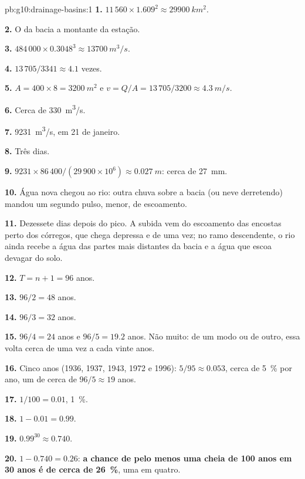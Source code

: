 \begin{solution}{pb:g10:drainage-basins:1}
\textbf{1.} $11\,560 \times 1.609^2 \approx \qty{29900}{km^2}$.

\textbf{2.} O  da bacia a montante da estação.

\textbf{3.} $484\,000 \times 0.3048^3 \approx \qty{13700}{m^3/s}$.

\textbf{4.} $13\,705/3341 \approx 4.1$ vezes.

\textbf{5.} $A = 400 \times 8 = \qty{3200}{m^2}$ e $v = Q/A = 13\,705/3200
\approx \qty{4.3}{m/s}$.

\textbf{6.} Cerca de \qty{330}{m^3/s}.

\textbf{7.} \qty{9231}{m^3/s}, em 21 de janeiro.

\textbf{8.} Três dias.

\textbf{9.} $9231 \times 86\,400/(29\,900 \times 10^6) \approx
\qty{0.027}{m}$: cerca de \qty{27}{mm}.

\textbf{10.} Água nova chegou ao rio: outra chuva sobre a bacia (ou neve
derretendo) mandou um segundo pulso, menor, de escoamento.

\textbf{11.} Dezessete dias depois do pico. A subida vem do escoamento das
encostas perto dos córregos, que chega depressa e de uma vez; no ramo
descendente, o rio ainda recebe a água das partes mais distantes da bacia e
a água que escoa devagar do solo.

\textbf{12.} $T = n + 1 = 96$ anos.

\textbf{13.} $96/2 = 48$ anos.

\textbf{14.} $96/3 = 32$ anos.

\textbf{15.} $96/4 = 24$ anos e $96/5 = 19.2$ anos. Não muito: de um modo
ou de outro, essa  volta cerca de uma vez a cada vinte anos.

\textbf{16.} Cinco anos (1936, 1937, 1943, 1972 e 1996): $5/95 \approx
0.053$, cerca de \qty{5}{\percent} por ano, um  de cerca de
$96/5 \approx 19$ anos.

\textbf{17.} $1/100 = 0.01$, \qty{1}{\percent}.

\textbf{18.} $1 - 0.01 = 0.99$.

\textbf{19.} $0.99^{30} \approx 0.740$.

\textbf{20.} $1 - 0.740 = 0.26$: \textbf{a chance de pelo menos uma cheia de
100 anos em 30 anos é de cerca de \qty{26}{\percent}}, uma em quatro.
\end{solution}
